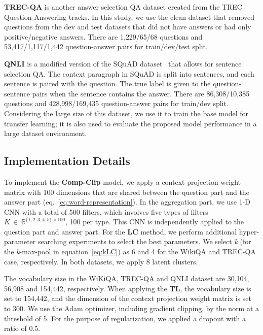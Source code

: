 \documentclass[sigconf]{acmart}
\begin{document}
\vspace*{2mm}
\noindent\textbf{TREC-QA}
\cite{wang2007jeopardy} is another answer selection QA dataset created from the TREC Question-Answering tracks. In this study, we use the clean dataset that removed questions from the dev and test datasets that did not have answers or had only positive/negative answers. There are 1,229/65/68 questions and 53,417/1,117/1,442 question-answer pairs for train/dev/test split.

\vspace*{2mm}
\noindent\textbf{QNLI}
\cite{wang2018glue} is a modified version of the SQuAD dataset~\cite{rajpurkar2016squad} that allows for sentence selection QA. The context paragraph in SQuAD is split into sentences, and each sentence is paired with the question. The true label is given to the question-sentence pairs when the sentence contains the answer. There are 86,308/10,385 questions and 428,998/169,435 question-answer pairs for train/dev split. Considering the large size of this dataset, we use it to train the base model for transfer learning; it is also used to evaluate the proposed model performance in a large dataset environment.



\subsection{Implementation Details}
\label{sec:implementation_details}
To implement the \textbf{Comp-Clip} model, we apply a context projection weight matrix with 100 dimensions that are shared between the question part and the answer part (eq.~\ref{eq:word-representation}). In the aggregation part, we use 1-D CNN with a total of 500 filters, which involves five types of filters $K\,{\in}\,\mathbb{R}^{\{1,2,3,4,5\}\times100}$, 100 per type. 
This CNN is independently applied to the question part and answer part.
For the \textbf{LC} method, we perform additional hyper-parameter searching experiments to select the best parameters. We select \textit{k} (for the \textit{k}-max-pool in equation~\ref{eq:kLC}) as 6 and 4 for the WikiQA and TREC-QA case, respectively. In both datasets, we apply 8 latent clusters.

The vocabulary size in the WiKiQA, TREC-QA and QNLI dataset are 30,104, 56,908 and 154,442, respectively. 
When applying the \textbf{TL}, the vocabulary size is set to 154,442, and the dimension of the context projection weight matrix is set to 300.
We use the Adam optimizer, including gradient clipping, by the norm at a threshold of 5.
For the purpose of regularization, we applied a dropout with a ratio of 0.5.
\end{document}
